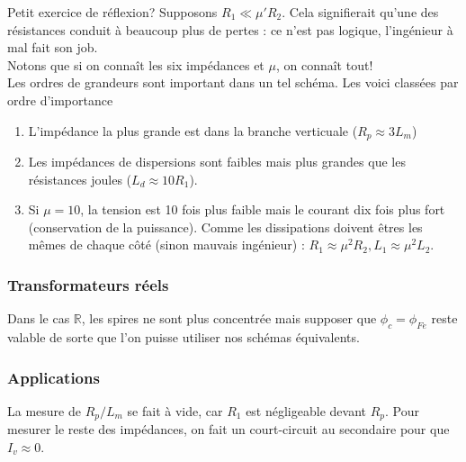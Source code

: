 		
		Petit exercice de réflexion? Supposons $R_1\ll \mu'R_2$. Cela signifierait 
		qu'une des résistances conduit à beaucoup plus de pertes : ce n'est pas 
		logique, l'ingénieur à mal fait son job.\\
		Notons que si on connaît les six impédances et $\mu$, on connaît tout!\\
		
		Les ordres de grandeurs sont important dans un tel schéma. Les voici 
		classées par ordre d'importance 
		\begin{enumerate}
		\item L'impédance la plus grande est dans la branche verticuale ($R_p \approx 
		3 L_m$)
		\item Les impédances de dispersions sont faibles mais plus grandes que 
		les résistances joules ($L_d \approx 10 R_1$).
		\item Si $\mu = 10$, la tension est 10 fois plus faible mais le courant 
		dix fois plus fort (conservation de la puissance). Comme les dissipations 
		doivent êtres les mêmes de chaque côté (sinon mauvais ingénieur) : $R_1 
		\approx \mu^2R_2, L_1\approx \mu^2L_2$.
		\end{enumerate}
		
	
		\subsubsection{Transformateurs réels}
		Dans le cas $\mathbb{R}$, les spires ne sont plus concentrée mais 
		supposer que $\phi_c = \phi_{Fe}$ reste valable de sorte que l'on 
		puisse utiliser nos schémas équivalents.	
	
		\subsubsection{Applications}
		La mesure de $R_p/L_m$ se fait à vide, car $R_1$ est négligeable devant 
		$R_p$. Pour mesurer le reste des impédances, on fait un court-circuit 
		au secondaire pour que $I_v\approx0$.
		
		
	\setcounter{subsection}{4}	
